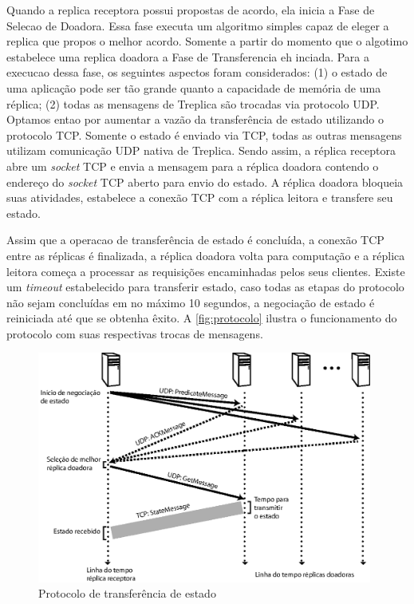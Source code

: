 Quando a replica receptora possui propostas de acordo, ela inicia a Fase de Selecao de
Doadora. Essa fase executa um algoritmo simples capaz de eleger a replica que propos o
melhor acordo. Somente a partir do momento que o algotimo estabelece uma replica doadora a
Fase de Transferencia eh inciada. Para a execucao dessa fase, os seguintes aspectos foram
considerados: (1) o estado de uma aplicação pode ser tão grande quanto a capacidade de
memória de uma réplica; (2) todas as mensagens de Treplica são trocadas via protocolo UDP.
Optamos entao por aumentar a vazão da transferência de estado utilizando o protocolo TCP.
Somente o estado é enviado via TCP, todas as outras mensagens utilizam comunicação UDP
nativa de Treplica. Sendo assim, a réplica receptora abre um \emph{socket} TCP e envia a
mensagem  para a réplica doadora contendo o endereço do
\emph{socket} TCP aberto para envio do estado. A réplica doadora bloqueia suas atividades,
estabelece a conexão TCP com a réplica leitora e transfere seu estado.

Assim que a operacao de transferência de estado é concluída, a conexão TCP entre as
réplicas é finalizada, a réplica doadora volta para computação e a réplica leitora começa
a processar as requisições encaminhadas pelos seus clientes. Existe um \emph{timeout}
estabelecido para transferir estado, caso todas as etapas do protocolo não sejam
concluídas em no máximo 10 segundos, a negociação de estado é reiniciada até que se
obtenha êxito. A \autoref{fig:protocolo} ilustra o funcionamento do protocolo com suas
respectivas trocas de mensagens.

\begin{figure}[ht]
  \centering
  \includegraphics[width=11cm]{conteudo/capitulos/figuras/transferencia_estado.eps}
  \caption{Protocolo de transferência de estado}
  \label{fig:protocolo}
\end{figure}

